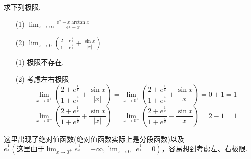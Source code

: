 \begin{xiti}
\begin{solution}
\begin{enumerate}
	\end{enumerate}
	
\end{solution}
\item 求下列极限.
\begin{enumerate}
	\item[(1)] $\lim _ { x \rightarrow \infty } \frac { \mathrm { e } ^ { x } - x \arctan x } { \mathrm { e } ^ { x } + x }$
	\item[(2)] $\lim _ { x \rightarrow 0 } \left( \frac { 2 + e ^ { \frac { 1 } { x } } } { 1 + e ^ { \frac { 4 } { x } } } + \frac { \sin x } { | x | } \right)$
\end{enumerate}
\begin{solution}
	\begin{enumerate}
		\item[(1)] 极限不存在.
		\item[(2)] 考虑左右极限
		\[\lim\limits_{x \to 0^{+} } \left(\frac{{2 + {e^{\frac{1}{x}}}}}{{1 + {e^{\frac{4}{x}}}}} + \frac{{\sin x}}{{|x|}}\right) = \mathop {\lim }\limits_{x \to 0^{+} }\left(\frac{{2 + {e^{\frac{1}{x}}}}}{{1 + {e^{\frac{4}{x}}}}} + \frac{{\sin x}}{x}\right) = 0 + 1 = 1\]
		\[\lim \limits_{x \to 0^{-} } \left(\frac{{2 + {e^{\frac{1}{x}}}}}{{1 + {e^{\frac{4}{x}}}}} + \frac{{\sin x}}{{|x|}}\right) = \mathop {\lim }\limits_{x \to 0^{-} } \left(\frac{{2 + {e^{\frac{1}{x}}}}}{{1 + {e^{\frac{4}{x}}}}} - \frac{{\sin x}}{x}\right) = 2 - 1 = 1\]
	\end{enumerate}
\begin{note}
	这里出现了绝对值函数(绝对值函数实际上是分段函数)以及$e^{\frac{1}{x}}(\text{这里由于}\lim _{x \rightarrow 0^{+}} e^{\frac{1}{x}}=+\infty, \lim _{x \rightarrow 0^{-}} e^{\frac{1}{x}}=0)$，容易想到考虑左、右极限.
\end{note}
	

\end{solution}
\end{xiti}
